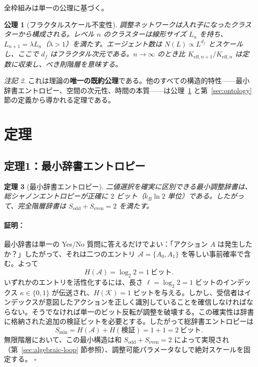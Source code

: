 \documentclass[12pt,a4paper]{article}
\newtheorem{theorem}{定理}[section]
\newtheorem{axiom}[theorem]{公理}
\theoremstyle{remark}
\newtheorem{remark}[theorem]{注記}
\renewenvironment{proof}{\paragraph{証明：}}{\hfill$\square$}
\begin{document}
	全枠組みは単一の公理に基づく。
	
	\begin{axiom}[フラクタルスケール不変性]
		\label{ax:A1}
		調整ネットワークは入れ子になったクラスターから構成される。レベル \(n\) のクラスターは線形サイズ \(L_n\) を持ち、\(L_{n+1} = \lambda L_n\)（\(\lambda > 1\)）を満たす。エージェント数は \(N(L) \propto L^{d_f}\) とスケールし、ここで \(d_f\) はフラクタル次元である。\(n \to \infty\) のとき比 \(K_{\mathrm{eff},n+1}/K_{\mathrm{eff},n}\) は定数に収束し、べき則階層を意味する。
	\end{axiom}
	
	\begin{remark}
		これは理論の\textbf{唯一の既約公理}である。他のすべての構造的特性——最小辞書エントロピー、空間の次元性、時間の本質——は公理~\ref{ax:A1} と第~\ref{sec:ontology} 節の定義から導かれる定理である。
	\end{remark}
	
	\section{定理}
	\label{sec:theorems}
	
	\subsection{定理1：最小辞書エントロピー}
	
	\begin{theorem}[最小辞書エントロピー]
		\label{thm:minimal-dict}
		二値選択を確実に区別できる最小調整辞書は、総シャノンエントロピーが正確に \(2\) ビット（\(k_B\ln 2\) 単位）である。したがって、完全階層辞書は \(S_{\mathrm{odd}} + S_{\mathrm{even}} = 2\) を満たす。
	\end{theorem}
	
	\begin{proof}
		最小辞書は単一の Yes/No 質問に答えるだけでよい：「アクション \(A\) は発生したか？」したがって、それは二つのエントリ \(\mathcal{A} = \{A_0, A_1\}\) を等しい事前確率で含む。よって
		\[
		H(\mathcal{A}) = \log_2 2 = 1\ \text{ビット}.
		\]
		いずれかのエントリを活性化するには、長さ \(\ell = \log_2 2 = 1\) ビットのインデックス \(\kappa \in \{0,1\}\) が伝送され、\(H(\mathcal{K}) = 1\) ビットを与える。しかし、受信者はインデックスが意図したアクションを正しく識別していることを確信しなければならない。そうでなければ単一のビット反転が調整を破壊する。この確実性は辞書に格納された追加の検証ビットを必要とする。したがって総辞書エントロピーは
		\[
		S_{\min} = H(\mathcal{A}) + H(\text{検証}) = 1 + 1 = 2\ \text{ビット}.
		\]
		無限階層において、この最小構造は和 \(S_{\mathrm{odd}} + S_{\mathrm{even}} = 2\) によって実現され（第~\ref{sec:algebraic-loop} 節参照）、調整可能パラメータなしで絶対スケールを固定する。
	\end{proof}
	
\end{document}
